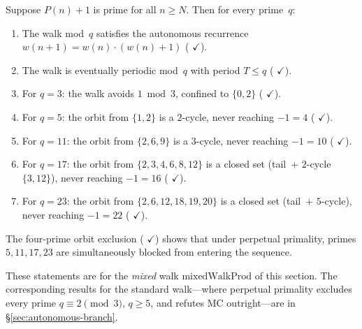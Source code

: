 \begin{theorem}
\label{thm:perpetual-periodicity}
Suppose $P(n)+1$ is prime for all $n \geq N$.  Then for every prime~$q$:
\begin{enumerate}[nosep]
\item The walk mod~$q$ satisfies the autonomous recurrence
  $w(n{+}1) = w(n) \cdot (w(n){+}1)$
  (
  {\color{leanink}$\checkmark$}).
\item The walk is eventually periodic mod~$q$ with period $T \leq q$
  (
  {\color{leanink}$\checkmark$}).
\item For $q = 3$: the walk avoids $1 \bmod 3$, confined to $\{0, 2\}$
  (
  {\color{leanink}$\checkmark$}).
\item For $q = 5$: the orbit from $\{1, 2\}$ is a $2$-cycle, never reaching
  $-1 = 4$
  (
  {\color{leanink}$\checkmark$}).
\item For $q = 11$: the orbit from $\{2, 6, 9\}$ is a $3$-cycle, never
  reaching $-1 = 10$
  (
  {\color{leanink}$\checkmark$}).
\item For $q = 17$: the orbit from $\{2, 3, 4, 6, 8, 12\}$ is a closed
  set (tail~$+$ $2$-cycle $\{3, 12\}$), never reaching $-1 = 16$
  (
  {\color{leanink}$\checkmark$}).
\item For $q = 23$: the orbit from $\{2, 6, 12, 18, 19, 20\}$ is a closed
  set (tail~$+$ $5$-cycle), never reaching $-1 = 22$
  (
  {\color{leanink}$\checkmark$}).
\end{enumerate}
The four-prime orbit exclusion
(
{\color{leanink}$\checkmark$})
shows that under perpetual primality, primes $5, 11, 17, 23$ are
simultaneously blocked from entering the sequence.
\end{theorem}

\noindent
These statements are for the \emph{mixed} walk
$\mathrm{mixedWalkProd}$ of this section.  The corresponding results
for the standard walk---where perpetual primality excludes every prime
$q \equiv 2 \pmod 3$, $q \geq 5$, and refutes MC outright---are in
\S\ref{sec:autonomous-branch}.

